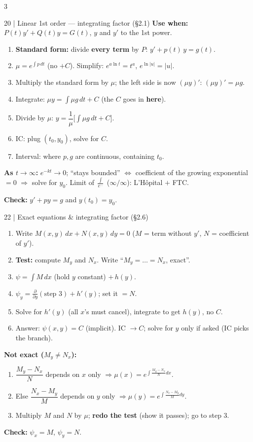 \documentclass[8pt]{extarticle}
\newcommand{\key}[1]{\textcolor{grn}{\textbf{#1}}}
\newcommand{\when}[1]{\textcolor{amb}{\textbf{Use when:}} #1\par}
\newcommand{\chk}[1]{\par\textcolor{grn}{\textbf{Check:}} #1}
\begin{document}
\begin{multicols*}{3}
\begin{card}{20 \;|\; Linear 1st order --- integrating factor (\S2.1)}
\when{$P(t)y'+Q(t)y=G(t)$, $y$ and $y'$ to the 1st power.}
\begin{enumerate}
\item \key{Standard form:} divide \textbf{every term} by $P$: \;$y'+p(t)\,y=g(t)$.
\item $\mu=e^{\int p\,dt}$ (no $+C$). Simplify: $e^{a\ln t}=t^a$, $e^{\ln|u|}=|u|$.
\item Multiply the standard form by $\mu$; the left side is now $(\mu y)'$:\; $(\mu y)'=\mu g$.
\item Integrate: \;$\mu y=\int\mu g\,dt+C$ \;(the $C$ goes in \textbf{here}).
\item Divide by $\mu$: \;$y=\dfrac1\mu\Big[\displaystyle\int\mu g\,dt+C\Big]$.
\item IC: plug $(t_0,y_0)$, solve for $C$.
\item Interval: where $p,g$ are continuous, containing $t_0$.
\end{enumerate}
\key{As $t\to\infty$:} $e^{-kt}\to0$; ``stays bounded'' $\iff$ coefficient of the growing exponential $=0$ $\Rightarrow$ solve for $y_0$. Limit of $\frac{\int}{e^{\dots}}$ ($\infty/\infty$): L'H\^opital $+$ FTC.
\chk{$y'+py=g$ and $y(t_0)=y_0$.}
\end{card}

\begin{card}{22 \;|\; Exact equations \& integrating factor (\S2.6)}
\begin{enumerate}
\item Write $M(x,y)\,dx+N(x,y)\,dy=0$ ($M$ = term without $y'$, $N$ = coefficient of $y'$).
\item \key{Test:} compute $M_y$ and $N_x$. Write ``$M_y=\dots=N_x$, exact''.
\item $\psi=\int M\,dx$ (hold $y$ constant) $+\,h(y)$.
\item $\psi_y=\frac{\partial}{\partial y}(\text{step 3})+h'(y)$; set it $=N$.
\item Solve for $h'(y)$ (all $x$'s must cancel), integrate to get $h(y)$, no $C$.
\item Answer: $\psi(x,y)=C$ (implicit). IC $\to C$; solve for $y$ only if asked (IC picks the branch).
\end{enumerate}
\key{Not exact ($M_y\ne N_x$):}
\begin{enumerate}[resume]
\item $\dfrac{M_y-N_x}{N}$ depends on $x$ only $\Rightarrow\mu(x)=e^{\int\frac{M_y-N_x}{N}dx}$.
\item Else $\dfrac{N_x-M_y}{M}$ depends on $y$ only $\Rightarrow\mu(y)=e^{\int\frac{N_x-M_y}{M}dy}$.
\item Multiply $M$ and $N$ by $\mu$; \textbf{redo the test} (show it passes); go to step 3.
\end{enumerate}
\chk{$\psi_x=M$, $\psi_y=N$.}
\end{card}


\end{multicols*}
\end{document}
